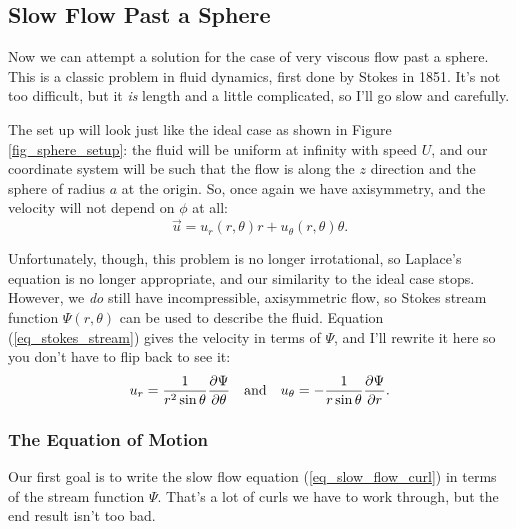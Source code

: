 \subsection{Slow Flow Past a Sphere}

Now we can attempt a solution for the case of very viscous flow past a sphere.  This is a classic problem in fluid dynamics, first done by Stokes in 1851.  It's not too difficult, but it \emph{is} length and a little complicated, so I'll go slow and carefully.

The set up will look just like the ideal case as shown in Figure \ref{fig_sphere_setup}: the fluid will be uniform at infinity with speed $U$, and our coordinate system will be such that the flow is along the $z$ direction and the sphere of radius $a$ at the origin.  So, once again we have axisymmetry, and the velocity will not depend on $\phi$ at all:
\[
\vec{u} = u_r(r, \theta) \unit{r} + u_\theta(r, \theta) \unit{\theta}.
\]

Unfortunately, though, this problem is no longer irrotational, so Laplace's equation is no longer appropriate, and our similarity to the ideal case stops.  However, we \emph{do} still have incompressible, axisymmetric flow, so Stokes stream function $\Psi(r, \theta)$ can be used to describe the fluid.  Equation (\ref{eq_stokes_stream}) gives the velocity in terms of $\Psi$, and I'll rewrite it here so you don't have to flip back to see it:
\[
u_r = \frac{1}{r^2 \sin \theta} \frac{\partial {\Psi}}{\partial {\theta}} \quad \text{and} \quad u_\theta = -\frac{1}{r \sin \theta} \frac{\partial {\Psi}}{\partial {r}}.
\]

\subsubsection{The Equation of Motion}

Our first goal is to write the slow flow equation (\ref{eq_slow_flow_curl}) in terms of the stream function $\Psi$.  That's a lot of curls we have to work through, but the end result isn't too bad.

